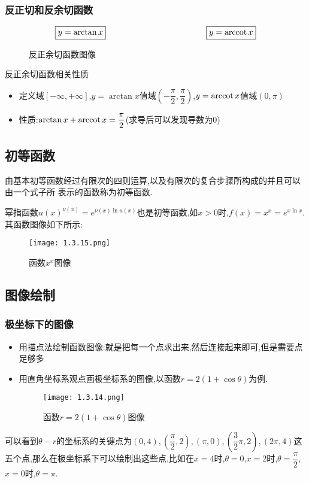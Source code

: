 \documentclass[8pt a4paper, oneside, UTF8]{ctexbook}  %
\begin{document}
\begin{sloppypar}
    \subsubsection{反正切和反余切函数}
    $$
        \boxed{y=\arctan x}
        \qquad \qquad \qquad \qquad \qquad \qquad
        \boxed{y=\mathrm{arccot}\, x}
    $$
    \begin{figure}[H] \centering
        \caption{反正余切函数图像}
    \end{figure}
    \begin{criterion}{反正余切函数相关性质}{}
        \begin{itemize}
            \item 定义域$[-\infty,+\infty]$,$y=\arctan x$值域$(-\dfrac{\pi}{2},\dfrac{\pi}{2})$,$y=\mathrm{arccot}\, x$值域$(0,\pi)$
            \item 性质:$\arctan x+\mathrm{arccot}\, x=\dfrac{\pi}{2}$(求导后可以发现导数为0)
        \end{itemize}
    \end{criterion}
    \subsection{初等函数}
    由基本初等函数经过有限次的四则运算,以及有限次的复合步骤所构成的并且可以由一个式子所
    表示的函数称为初等函数.
    \begin{criterion}{}{}
        幂指函数$u(x)^{\nu(x)}=e^{\nu(x)\ln u(x)}$也是初等函数,如$x>0$时,$f(x)=x^x=e^{x\ln x}$.其函数图像如下所示:
        \begin{figure}[H]
            \centering \texttt{[image: 1.3.15.png]} \caption{函数$x^x$图像}
        \end{figure}
    \end{criterion}
    \subsection{图像绘制}
    \subsubsection{极坐标下的图像}
    \begin{itemize}
        \item 用描点法绘制函数图像:就是把每一个点求出来,然后连接起来即可,但是需要点足够多
        \item 用直角坐标系观点画极坐标系的图像,以函数$r=2(1+\cos \theta )$为例.
              \begin{figure}[H]
                  \centering \texttt{[image: 1.3.14.png]} \caption{函数$r=2(1+\cos \theta)$图像}
              \end{figure}
    \end{itemize}
    可以看到$\theta - r $的坐标系的关键点为$(0,4),(\dfrac{\pi}{2},2),(\pi,0),(\dfrac{3}{2}\pi,2),(2\pi,4)$这五个点,那么在极坐标系下可以绘制出这些点,比如在$x=4$时,$\theta = 0$,$x=2$时,$\theta = \dfrac{\pi}{2}$,$x=0$时,$\theta = \pi$.

\end{sloppypar}
\end{document}
